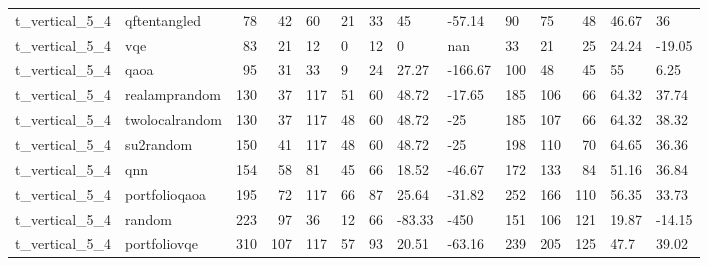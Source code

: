 \begin{longtable}{llrrllrllllrll}
t\_vertical\_5\_4 & qftentangled & 78 & 42 & 60 & 21 & 33 & 45 & -57.14 & 90 & 75 & 48 & 46.67 & 36 \\
t\_vertical\_5\_4 & vqe & 83 & 21 & 12 & 0 & 12 & 0 & nan & 33 & 21 & 25 & 24.24 & -19.05 \\
t\_vertical\_5\_4 & qaoa & 95 & 31 & 33 & 9 & 24 & 27.27 & -166.67 & 100 & 48 & 45 & 55 & 6.25 \\
t\_vertical\_5\_4 & realamprandom & 130 & 37 & 117 & 51 & 60 & 48.72 & -17.65 & 185 & 106 & 66 & 64.32 & 37.74 \\
t\_vertical\_5\_4 & twolocalrandom & 130 & 37 & 117 & 48 & 60 & 48.72 & -25 & 185 & 107 & 66 & 64.32 & 38.32 \\
t\_vertical\_5\_4 & su2random & 150 & 41 & 117 & 48 & 60 & 48.72 & -25 & 198 & 110 & 70 & 64.65 & 36.36 \\
t\_vertical\_5\_4 & qnn & 154 & 58 & 81 & 45 & 66 & 18.52 & -46.67 & 172 & 133 & 84 & 51.16 & 36.84 \\
t\_vertical\_5\_4 & portfolioqaoa & 195 & 72 & 117 & 66 & 87 & 25.64 & -31.82 & 252 & 166 & 110 & 56.35 & 33.73 \\
t\_vertical\_5\_4 & random & 223 & 97 & 36 & 12 & 66 & -83.33 & -450 & 151 & 106 & 121 & 19.87 & -14.15 \\
t\_vertical\_5\_4 & portfoliovqe & 310 & 107 & 117 & 57 & 93 & 20.51 & -63.16 & 239 & 205 & 125 & 47.7 & 39.02 \\
\end{longtable}
